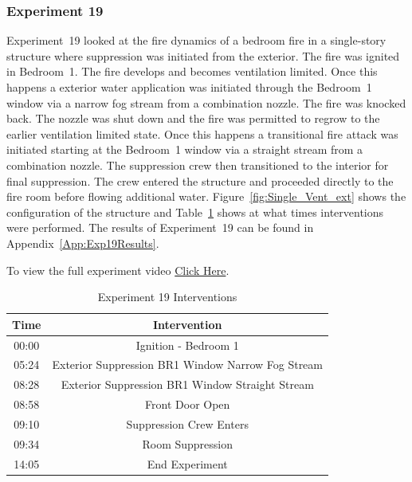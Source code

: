 \documentclass[12pt,oneside]{book}
\begin{document}
\subsubsection{Experiment 19}
Experiment~19 looked at the fire dynamics of a bedroom fire in a single-story structure where suppression was initiated from the exterior. The fire was ignited in Bedroom~1. The fire develops and becomes ventilation limited. Once this happens a exterior water application was initiated through the Bedroom~1 window via a narrow fog stream from a combination nozzle. The fire was knocked back. The nozzle was shut down and the fire was permitted to regrow to the earlier ventilation limited state.  Once this happens a transitional fire attack was initiated starting at the Bedroom~1 window via a straight stream from a combination nozzle. The suppression crew then transitioned to the interior for final suppression. The crew entered the structure and proceeded directly to the fire room before flowing additional water. Figure~\ref{fig:Single_Vent_ext} shows the configuration of the structure and Table~\ref{Table:Exp19Interventions} shows at what times interventions were performed. The results of Experiment~19 can be found in Appendix~\ref{App:Exp19Results}. 

To view the full experiment video \href{https://player.vimeo.com/video/170499621?autoplay=1}{Click Here}.

\begin{table}[H]
	\centering
	\caption{Experiment 19 Interventions}
	\begin{tabular}{|c|c|} 
		\hline
		Time & Intervention \\ \hline \hline
		00:00 & Ignition - Bedroom 1 \\ \hline
		05:24 & Exterior Suppression BR1 Window Narrow Fog Stream \\ \hline
		08:28 & Exterior Suppression BR1 Window Straight Stream \\ \hline
		08:58 & Front Door Open \\ \hline
		09:10 & Suppression Crew Enters\\ \hline
		09:34 & Room Suppression \\ \hline 
		14:05 & End Experiment\\ \hline
	\end{tabular}
	\label{Table:Exp19Interventions}
\end{table}

\FloatBarrier
\end{document}
